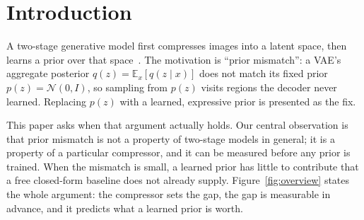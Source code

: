 \documentclass[sigconf,nonacm]{acmart}
\begin{document}

\maketitle

\section{Introduction}
\label{sec:intro}

A two-stage generative model first compresses images into a latent space, then
learns a prior over that space~\cite{ldm,lsgm}. The motivation is
``prior mismatch'': a VAE's aggregate posterior $q(z)=\mathbb{E}_{x}[q(z\mid
x)]$ does not match its fixed prior $p(z)=\mathcal{N}(0,I)$, so sampling from
$p(z)$ visits regions the decoder never learned. Replacing $p(z)$ with a
learned, expressive prior is presented as the fix.

This paper asks when that argument actually holds. Our central observation is
that prior mismatch is not a property of two-stage models in general; it is a
property of a particular compressor, and it can be measured before any prior is
trained. When the mismatch is small, a learned prior has little to contribute
that a free closed-form baseline does not already supply.
Figure~\ref{fig:overview} states the whole argument: the compressor sets the
gap, the gap is measurable in advance, and it predicts what a learned prior is
worth.
\end{document}

